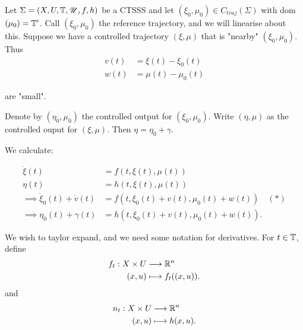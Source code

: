 
Let $\Sigma = \left( X, U, \mathbb{T} , \mathscr{U}, f, h \right) $ be a CTSSS and let $\left( \xi_0, \mu_0 \right) \in  C_{traj}\left( \Sigma \right) $ with dom$\left( \mu_0 \right) = \mathbb{T} '$. Call $\left( \xi_0 , \mu_0 \right) $ the reference trajectory, and we will linearise about this. Suppose we have a controlled trajectory $\left( \xi, \mu \right) $ that is "nearby" $\left( \xi_0, \mu_0 \right) $. Thus
\begin{align*}
	v\left( t \right) &= \xi\left( t \right) - \xi_0\left( t \right)  \\
	w\left( t \right) &= \mu\left( t \right) - \mu_0\left( t \right) 
\end{align*}

are "small". 

Denote by $\left( \eta_0 , \mu_0\right) $ the controlled output for $\left( \xi_0, \mu_0 \right) $. Write $\left( \eta, \mu \right) $ as the controlled ouput for $\left( \xi, \mu \right) $. Then $\eta = \eta_0 + \gamma$.

We calculate:

\begin{align*}
	\dot{\xi} \left( t \right) &= f \left( t, \xi\left( t \right) , \mu\left( t \right)  \right)  \\
	\eta\left( t \right) &= h \left( t, \xi\left( t \right) , \mu\left( t \right)  \right)  \\
	\implies \dot{\xi} _{0}\left( t \right) + \dot{v}\left( t \right) &= f\left( t, \xi_0 \left( t \right)  + v\left( t \right) , \mu_0 \left( t \right) + w\left( t \right) \right)  \quad \left( * \right)  \\
	\implies \eta_0 \left( t \right) + \gamma\left( t \right) &= h\left( t, \xi_0\left( t \right) + v\left( t \right) , \mu_0 \left( t \right) + w\left( t \right)  \right) 
.\end{align*}

We wish to taylor expand, and we need some notation for derivatives. For $t \in  \mathbb{T} $, define 
\begin{align*}
	f_{t}: X \times  U &\longrightarrow \mathbb{R}^{n} \\
	\left( x, u \right)  &\longmapsto f_{t}(\left( x, u \right) )
.\end{align*}
and 
\begin{align*}
n_{t}	: X \times U &\longrightarrow \mathbb{R}^{n} \\
\left( x, u \right)  &\longmapsto h (x, u) 
.\end{align*}	


